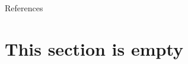 \documentclass{beamer}
\numberwithin{equation}{section}
\begin{document}
\begin{frame}{References}
    
    
\end{frame}

\section{This section is empty}
\end{document}

